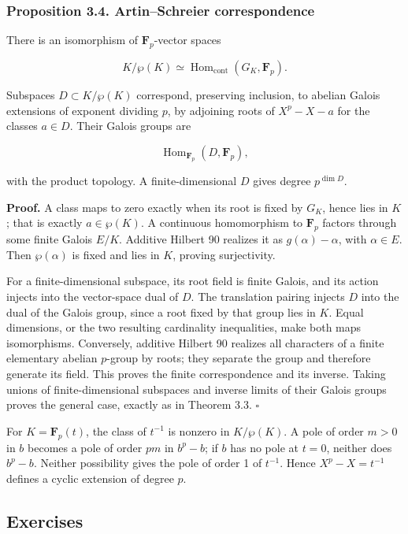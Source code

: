 \documentclass[11pt,a4paper]{article}
\begin{document}
\subsubsection{Proposition 3.4. Artin--Schreier
correspondence}\label{proposition-3.4.-artinschreier-correspondence}

There is an isomorphism of \(\mathbf F_p\)-vector spaces

\[
K/\wp(K)\simeq\operatorname{Hom}_{\mathrm{cont}}(G_K,\mathbf F_p).
\]

Subspaces \(D\subset K/\wp(K)\) correspond, preserving inclusion, to
abelian Galois extensions of exponent dividing \(p\), by adjoining roots
of \(X^p-X-a\) for the classes \(a\in D\). Their Galois groups are

\[
\operatorname{Hom}_{\mathbf F_p}(D,\mathbf F_p),
\]

with the product topology. A finite-dimensional \(D\) gives degree
\(p^{\dim D}\).

\textbf{Proof.} A class maps to zero exactly when its root is fixed by
\(G_K\), hence lies in \(K\); that is exactly \(a\in\wp(K)\). A
continuous homomorphism to \(\mathbf F_p\) factors through some finite
Galois \(E/K\). Additive Hilbert 90 realizes it as \(g(\alpha)-\alpha\),
with \(\alpha\in E\). Then \(\wp(\alpha)\) is fixed and lies in \(K\),
proving surjectivity.

For a finite-dimensional subspace, its root field is finite Galois, and
its action injects into the vector-space dual of \(D\). The translation
pairing injects \(D\) into the dual of the Galois group, since a root
fixed by that group lies in \(K\). Equal dimensions, or the two
resulting cardinality inequalities, make both maps isomorphisms.
Conversely, additive Hilbert 90 realizes all characters of a finite
elementary abelian \(p\)-group by roots; they separate the group and
therefore generate its field. This proves the finite correspondence and
its inverse. Taking unions of finite-dimensional subspaces and inverse
limits of their Galois groups proves the general case, exactly as in
Theorem 3.3. \(\square\)

For \(K=\mathbf F_p(t)\), the class of \(t^{-1}\) is nonzero in
\(K/\wp(K)\). A pole of order \(m>0\) in \(b\) becomes a pole of order
\(pm\) in \(b^p-b\); if \(b\) has no pole at \(t=0\), neither does
\(b^p-b\). Neither possibility gives the pole of order 1 of \(t^{-1}\).
Hence \(X^p-X=t^{-1}\) defines a cyclic extension of degree \(p\).

\subsection{Exercises}\label{exercises}
\end{document}
